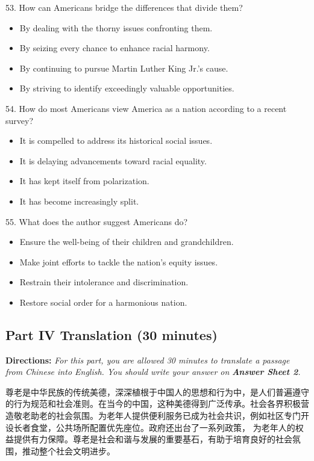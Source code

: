 \documentclass[UTF8,11pt]{ctexart}
\begin{document}
53. How can Americans bridge the differences that divide them?


\begin{itemize}[leftmargin=2em,itemsep=.2em,topsep=.4em]\item[A.] By dealing with the thorny issues confronting them.
\item[B.] By seizing every chance to enhance racial harmony.
\item[C.] By continuing to pursue Martin Luther King Jr.’s cause.
\item[D.] By striving to identify exceedingly valuable opportunities.
\end{itemize}

54. How do most Americans view America as a nation according to a recent survey?


\begin{itemize}[leftmargin=2em,itemsep=.2em,topsep=.4em]\item[A.] It is compelled to address its historical social issues.
\item[B.] It is delaying advancements toward racial equality.
\item[C.] It has kept itself from polarization.
\item[D.] It has become increasingly split.
\end{itemize}

55. What does the author suggest Americans do?


\begin{itemize}[leftmargin=2em,itemsep=.2em,topsep=.4em]\item[A.] Ensure the well-being of their children and grandchildren.
\item[B.] Make joint efforts to tackle the nation’s equity issues.
\item[C.] Restrain their intolerance and discrimination.
\item[D.] Restore social order for a harmonious nation.
\end{itemize}

\subsection*{\textbf{Part IV Translation} \textbf{(30 minutes)}}


\textbf{Directions: }\textit{For this part, you are allowed 30 minutes to translate a passage from Chinese into English. You should} \textit{write your answer on }\textbf{\textit{Answer Sheet 2}}\textit{.}


尊老是中华民族的传统美德，深深植根于中国人的思想和行为中，是人们普遍遵守的行为规范和社会准则。在当今的中国，这种美德得到广泛传承。社会各界积极营造敬老助老的社会氛围。为老年人提供便利服务已成为社会共识，例如社区专门开设长者食堂，公共场所配置优先座位。政府还出台了一系列政策， 为老年人的权益提供有力保障。尊老是社会和谐与发展的重要基石，有助于培育良好的社会氛围，推动整个社会文明进步。
\end{document}
